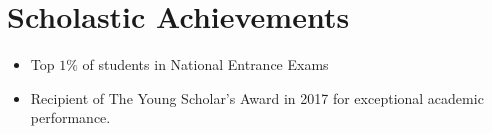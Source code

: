\documentclass[10pt]{article}
\begin{document}
\section{{\color{battleshipgrey}Scholastic Achievements}}
	\begin{itemize}
		\setlength\itemsep{0.01cm}
		\item{Top $1\%$ of students in National Entrance Exams}
		\item{Recipient of The Young Scholar's Award in 2017 for exceptional academic performance.}
	\end{itemize}
\end{document}
